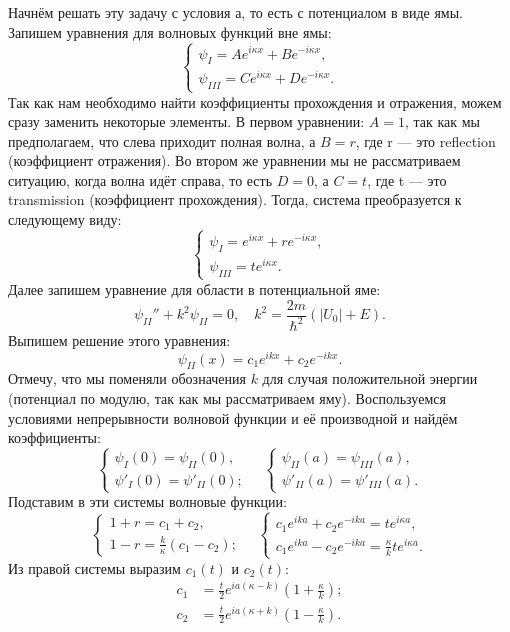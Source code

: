 Начнём решать эту задачу с условия а, то есть с потенциалом в виде ямы. Запишем
уравнения для волновых функций вне ямы:
\[
  \begin{cases}
    \psi_I = Ae^{i\kappa x} + Be^{-i\kappa x}, \\
    \psi_{III} = Ce^{i\kappa x} + De^{-i\kappa x}.
  \end{cases}
\]
Так как нам необходимо найти коэффициенты прохождения и отражения, можем сразу
заменить некоторые элементы. В первом уравнении: $A = 1$, так как мы
предполагаем, что слева приходит полная волна, а $B = r$, где r --- это
reflection (коэффициент отражения). Во втором же уравнении мы не рассматриваем
ситуацию, когда волна идёт справа, то есть $D = 0$, а $C = t$, где t --- это
transmission (коэффициент прохождения). Тогда, система преобразуется к
следующему виду:
\[
  \begin{cases}
    \psi_I = e^{i\kappa x} + re^{-i\kappa x}, \\
    \psi_{III} = te^{i\kappa x}.
  \end{cases}
\]
Далее запишем уравнение для области в потенциальной яме:
\[
  \psi_{II}'' + k^2\psi_{II} = 0, \quad k^2 = \frac{2m}{\hbar^2}(|U_0| + E).
\]
Выпишем решение этого уравнения:
\[
  \psi_{II}(x) = c_1e^{ikx} + c_2e^{-ikx}.
\]
Отмечу, что мы поменяли обозначения $k$ для случая положительной энергии
(потенциал по модулю, так как мы рассматриваем яму). Воспользуемся условиями
непрерывности волновой функции и её производной и найдём коэффициенты:
\[
  \begin{cases}
    \psi_I(0) = \psi_{II}(0), \\
    \psi'_I(0) = \psi'_{II}(0);
  \end{cases}
  \quad
  \begin{cases}
    \psi_{II}(a) = \psi_{III}(a), \\
    \psi'_{II}(a) = \psi'_{III}(a).
  \end{cases}
\]
Подставим в эти системы волновые функции:
\[
  \begin{cases}
    1 + r = c_1 + c_2, \\
    1-r = \frac{k}{\kappa}(c_1 - c_2);
  \end{cases}
  \quad
  \begin{cases}
    c_1e^{ika} + c_2e^{-ika} = te^{i\kappa a},\\
    c_1e^{ika} - c_2e^{-ika} = \frac{\kappa}{k}te^{i\kappa a}.
  \end{cases}
\]
Из правой системы выразим $c_1(t)$ и $c_2(t)$:
\begin{align*}
  c_1 &= \frac{t}{2}e^{ia(\kappa - k)}(1 + \frac{\kappa}{k});\\
  c_2 &= \frac{t}{2}e^{ia(\kappa + k)}(1 - \frac{\kappa}{k}).
\end{align*}
